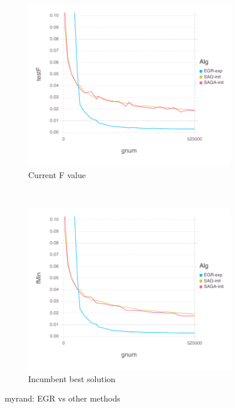 \documentclass[11pt]{article}
\begin{document}
   \begin{figure}[H]
       \centering
       \begin{subfigure}[b]{0.45\textwidth}
           \includegraphics[width=\textwidth]{Figures/myrandBLtrueFfFinal-g.pdf}
           \caption{Current F value}
       \end{subfigure}
       ~ %
         \begin{subfigure}[b]{0.45\textwidth}
             \includegraphics[width=\textwidth]{Figures/myrandBLtrueFminfFinal-g.pdf}
             \caption{Incumbent best solution}
         \end{subfigure}
       \caption{myrand: EGR vs other methods}\label{fig:myrandom}
   \end{figure}
   
\end{document}
